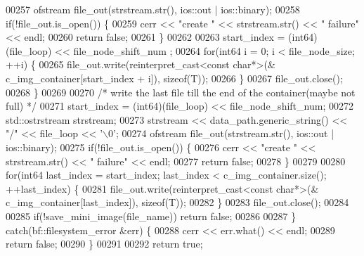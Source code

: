 \begin{DoxyCode}
00257                         ofstream file\_out(strstream.str(), ios::out | 
      ios::binary);
00258                         \textcolor{keywordflow}{if}(!file\_out.is\_open()) \{
00259                                 cerr << \textcolor{stringliteral}{"create "} << strstream.str() << \textcolor{stringliteral}{"
       failure"} << endl;
00260                                 \textcolor{keywordflow}{return} \textcolor{keyword}{false};
00261                         \}
00262 
00263                         start\_index = (int64)(file\_loop) << file\_node\_shift\_num
      ;
00264                         \textcolor{keywordflow}{for}(int64 i = 0; i < file\_node\_size; ++i) \{
00265                                 file\_out.write(reinterpret\_cast<const char*>(&
      c\_img\_container[start\_index + i]), \textcolor{keyword}{sizeof}(T));
00266                         \}
00267                         file\_out.close();
00268                 \}
00269 
00270                 \textcolor{comment}{/* write the last file till the end of the container(maybe not
       full) */}
00271                 start\_index = (int64)(file\_loop) << file\_node\_shift\_num;
00272                 std::ostrstream strstream;
00273                 strstream << data\_path.generic\_string() << \textcolor{stringliteral}{"/"} << file\_loop << \textcolor{charliteral}{
      '\(\backslash\)0'};
00274                 ofstream file\_out(strstream.str(), ios::out | ios::binary);
00275                 \textcolor{keywordflow}{if}(!file\_out.is\_open()) \{
00276                         cerr << \textcolor{stringliteral}{"create "} << strstream.str() << \textcolor{stringliteral}{" failure"} << 
      endl;
00277                         \textcolor{keywordflow}{return} \textcolor{keyword}{false};
00278                 \}
00279 
00280                 \textcolor{keywordflow}{for}(int64 last\_index = start\_index; last\_index < 
      c\_img\_container.size(); ++last\_index) \{
00281                         file\_out.write(reinterpret\_cast<const char*>(&
      c\_img\_container[last\_index]), \textcolor{keyword}{sizeof}(T));
00282                 \}
00283                 file\_out.close();
00284                 
00285                 \textcolor{keywordflow}{if}(!save\_mini\_image(file\_name)) \textcolor{keywordflow}{return} \textcolor{keyword}{false};
00286 
00287         \} \textcolor{keywordflow}{catch}(bf::filesystem\_error &err) \{
00288                 cerr << err.what() << endl;
00289                 \textcolor{keywordflow}{return} \textcolor{keyword}{false};
00290         \}
00291 
00292         \textcolor{keywordflow}{return} \textcolor{keyword}{true};

\end{DoxyCode}
